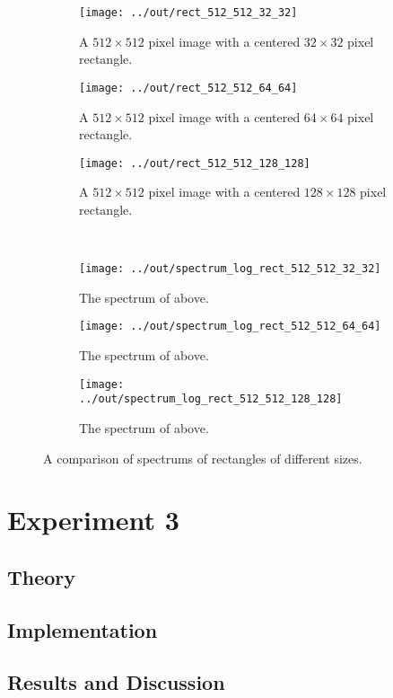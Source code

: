 \documentclass[headings=optiontoheadandtoc,listof=totoc,parskip=full]{scrartcl}
\begin{document}
\begin{figure}[H]
	\centering
	\begin{subfigure}[t]{.3\textwidth}
		\centering
		\texttt{[image: ../out/rect\_512\_512\_32\_32]}
		\caption{A $512 \times 512$ pixel image with a centered $32 \times 32$ pixel rectangle.}
	\end{subfigure}
	\quad
	\begin{subfigure}[t]{.3\textwidth}
		\centering
		\texttt{[image: ../out/rect\_512\_512\_64\_64]}
		\caption{A $512 \times 512$ pixel image with a centered $64 \times 64$ pixel rectangle.}
	\end{subfigure}
	\quad
	\begin{subfigure}[t]{.3\textwidth}
		\centering
		\texttt{[image: ../out/rect\_512\_512\_128\_128]}
		\caption{A $512 \times 512$ pixel image with a centered $128 \times 128$ pixel rectangle.}
	\end{subfigure}
	\\
	\begin{subfigure}[t]{.3\textwidth}
		\centering
		\texttt{[image: ../out/spectrum\_log\_rect\_512\_512\_32\_32]}
		\caption{The spectrum of above.}
	\end{subfigure}
	\quad
	\begin{subfigure}[t]{.3\textwidth}
		\centering
		\texttt{[image: ../out/spectrum\_log\_rect\_512\_512\_64\_64]}
		\caption{The spectrum of above.}
	\end{subfigure}
	\quad
	\begin{subfigure}[t]{.3\textwidth}
		\centering
		\texttt{[image: ../out/spectrum\_log\_rect\_512\_512\_128\_128]}
		\caption{The spectrum of above.}
	\end{subfigure}
	\caption{A comparison of spectrums of rectangles of different sizes.}
	\label{fig:rectangle-spectrum-comparison}
\end{figure}

\section{Experiment 3}
\label{sec:exp-3}


\subsection{Theory}


\subsection{Implementation}


\subsection{Results and Discussion}
\end{document}

